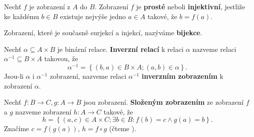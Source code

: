 \begin{definition}
  Nechť $f$ je zobrazení z $A$ do $B$. Zobrazení $f$ je \textbf{prosté} neboli \textbf{injektivní}, jestliže ke každému $b\in B$ existuje nejvýše jedno $a \in A$ takové, že $b=f(a).$
\end{definition}

\begin{definition}
  Zobrazení, které je současně surjekcí a injekcí, nazýváme \textbf{bijekce}.
\end{definition}

\begin{definition}
  Nechť $\alpha \subseteq A\times B$ je binární relace. \textbf{Inverzní relací} k relaci $\alpha$ nazveme relaci $\alpha^{-1} \subseteq B\times A$ takovou, že
  \[
    \alpha^{-1}=\left\{ (b,a)\in B\times A;  (a,b)\in \alpha\right\}.
  \]
  Jsou-li $\alpha$ i $\alpha^{-1}$ zobrazení, nazveme relaci $\alpha ^{-1}$ \textbf{inverzním zobrazením} k zobrazení $\alpha$.
\end{definition}

\begin{definition}
  Nechť $f\colon B\to C, g\colon A\to B$ jsou zobrazení. \textbf{Složeným zobrazením} ze zobrazení $f$ a $g$ nazveme zobrazení $h\colon A\to C$ takové, že
  \[
    h=\left\{ (a,c)\in A\times C;\exists b\in B\colon f(b)=c \land g(a)=b \right\}.
  \]
  Značíme $c=f(g(a))$, $h=f \circ g $ (čteme ).
\end{definition}
